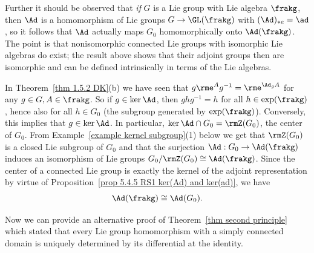 \begin{example}
    Further it should be observed that \emph{if} $G$ is a Lie group with Lie algebra $\frakg$, then $\Ad$ is a homomorphism of Lie groups $G\to\GL(\frakg)$ with $(\Ad)_{\ast e}=\ad$, so it follows that $\Ad$ actually maps $G_0$ homomorphically onto $\Ad(\frakg)$. The point is that nonisomorphic connected Lie groups with isomorphic Lie algebras do exist; the result above shows that their adjoint groups then are isomorphic and can be defined intrinsically in terms of the Lie algebras.

    In Theorem~\ref{thm 1.5.2 DK}(b) we have seen that $g\rme^A g^{-1}=\rme^{\Ad_g A}$ for any $g\in G,A\in\frakg$. So if $g\in\ker \Ad$, then $ghg^{-1}=h$ for all $h\in \exp(\frakg)$, hence also for all $h\in G_0$ (the subgroup generated by $\exp(\frakg)$). Conversely, this implies that $g\in\ker \Ad$. In particular, $\ker\Ad\cap G_0=\rmZ(G_0)$, the center of $G_0$. From Example~\ref{example kernel subgroup}(1) below we get that $\rmZ(G_0)$ is a closed Lie subgroup of $G_0$ and that the surjection $\Ad:G_0\to \Ad(\frakg)$ induces an isomorphism of Lie groups $G_0\slash \rmZ(G_0)\cong \Ad(\frakg)$. Since the center of a connected Lie group is exactly the kernel of
    the adjoint representation by virtue of Proposition~\ref{prop 5.4.5 RS1 ker(Ad) and ker(ad)}, we have 
    \[\Ad(\frakg)\cong \Ad(G_0).\]
\end{example}


Now we can provide an alternative proof of Theorem~\ref{thm second principle} which stated that every Lie group homomorphism with a simply connected domain is uniquely determined by its differential at the identity.


